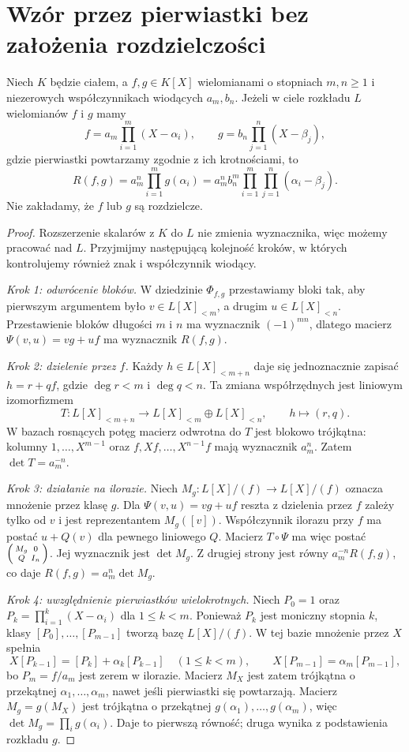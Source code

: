 \section{Wzór przez pierwiastki bez założenia rozdzielczości}
\begin{twierdzenie}\label{aa:tw:res-roots}
Niech $K$ będzie ciałem, a $f,g\in K[X]$ wielomianami o stopniach
$m,n\ge1$ i niezerowych współczynnikach wiodących $a_m,b_n$.
Jeżeli w ciele rozkładu $L$ wielomianów $f$ i $g$ mamy
\[
 f=a_m\prod_{i=1}^m(X-\alpha_i),\qquad
 g=b_n\prod_{j=1}^n(X-\beta_j),
\]
gdzie pierwiastki powtarzamy zgodnie z ich krotnościami, to
\[
 R(f,g)=a_m^n\prod_{i=1}^m g(\alpha_i)
 =a_m^nb_n^m\prod_{i=1}^m\prod_{j=1}^n(\alpha_i-\beta_j).
\]
Nie zakładamy, że $f$ lub $g$ są rozdzielcze.
\end{twierdzenie}
\begin{proof}
Rozszerzenie skalarów z $K$ do $L$ nie zmienia wyznacznika,
więc możemy pracować nad $L$. Przyjmijmy następującą kolejność
kroków, w których kontrolujemy również znak i współczynnik wiodący.

\emph{Krok 1: odwrócenie bloków.}
W dziedzinie $\Phi_{f,g}$ przestawiamy bloki tak, aby pierwszym
argumentem było $v\in L[X]_{<m}$, a drugim $u\in L[X]_{<n}$.
Przestawienie bloków długości $m$ i $n$ ma wyznacznik
$(-1)^{mn}$, dlatego macierz $\Psi(v,u)=vg+uf$ ma
wyznacznik $R(f,g)$.

\emph{Krok 2: dzielenie przez $f$.}
Każdy $h\in L[X]_{<m+n}$ daje się jednoznacznie zapisać
$h=r+qf$, gdzie $\deg r<m$ i $\deg q<n$.
Ta zmiana współrzędnych jest liniowym izomorfizmem
\[
 T:L[X]_{<m+n}\longrightarrow L[X]_{<m}\oplus L[X]_{<n},
 \qquad h\longmapsto(r,q).
\]
W bazach rosnących potęg macierz odwrotna do $T$ jest blokowo
trójkątna: kolumny $1,\ldots,X^{m-1}$ oraz
$f,Xf,\ldots,X^{n-1}f$ mają wyznacznik $a_m^n$.
Zatem $\det T=a_m^{-n}$.

\emph{Krok 3: działanie na ilorazie.}
Niech $M_g:L[X]/(f)\to L[X]/(f)$ oznacza mnożenie przez klasę
$g$. Dla $\Psi(v,u)=vg+uf$ reszta z dzielenia przez $f$
zależy tylko od $v$ i jest reprezentantem $M_g([v])$.
Współczynnik ilorazu przy $f$ ma postać $u+Q(v)$ dla pewnego
liniowego $Q$. Macierz $T\circ\Psi$ ma więc postać
$\begin{psmallmatrix}M_g&0\\Q&I_n\end{psmallmatrix}$.
Jej wyznacznik jest $\det M_g$. Z drugiej strony jest równy
$a_m^{-n}R(f,g)$, co daje
$R(f,g)=a_m^n\det M_g$.

\emph{Krok 4: uwzględnienie pierwiastków wielokrotnych.}
Niech $P_0=1$ oraz $P_k=\prod_{i=1}^k(X-\alpha_i)$
dla $1\le k<m$. Ponieważ $P_k$ jest moniczny stopnia $k$,
klasy $[P_0],\ldots,[P_{m-1}]$ tworzą bazę $L[X]/(f)$.
W tej bazie mnożenie przez $X$ spełnia
\[
 X[P_{k-1}]=[P_k]+\alpha_k[P_{k-1}]\quad(1\le k<m),
 \qquad X[P_{m-1}]=\alpha_m[P_{m-1}],
\]
bo $P_m=f/a_m$ jest zerem w ilorazie.
Macierz $M_X$ jest zatem trójkątna o przekątnej
$\alpha_1,\ldots,\alpha_m$, nawet jeśli pierwiastki się powtarzają.
Macierz $M_g=g(M_X)$ jest trójkątna o przekątnej
$g(\alpha_1),\ldots,g(\alpha_m)$, więc
$\det M_g=\prod_i g(\alpha_i)$. Daje to pierwszą równość;
druga wynika z podstawienia rozkładu $g$.
\end{proof}

